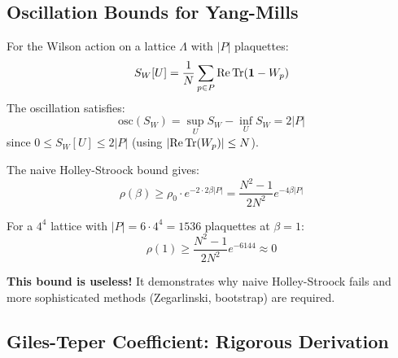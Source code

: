 \subsection{Oscillation Bounds for Yang-Mills}

\begin{proposition}
\label{prop:wilson-osc}
For the Wilson action on a lattice $\Lambda$ with $|P|$ plaquettes:
\[
S_W[U] = \frac{1}{N}\sum_{p \in P} \mathrm{Re}\operatorname{Tr}(\mathbf{1} - W_p)
\]
The oscillation satisfies:
\[
\mathrm{osc}(S_W) = \sup_U S_W - \inf_U S_W = 2|P|
\]
since $0 \leq S_W[U] \leq 2|P|$ (using $|\mathrm{Re}\operatorname{Tr}(W_p)| \leq N$).
\end{proposition}

\begin{corollary}
\label{cor:naive-degradation}
The naive Holley-Stroock bound gives:
\[
\rho(\beta) \geq \rho_0 \cdot e^{-2 \cdot 2\beta|P|} = \frac{N^2-1}{2N^2} e^{-4\beta|P|}
\]

For a $4^4$ lattice with $|P| = 6 \cdot 4^4 = 1536$ plaquettes at $\beta = 1$:
\[
\rho(1) \geq \frac{N^2-1}{2N^2} e^{-6144} \approx 0
\]

\textbf{This bound is useless!} It demonstrates why naive Holley-Stroock fails 
and more sophisticated methods (Zegarlinski, bootstrap) are required.
\end{corollary}

\subsection{Giles-Teper Coefficient: Rigorous Derivation}

